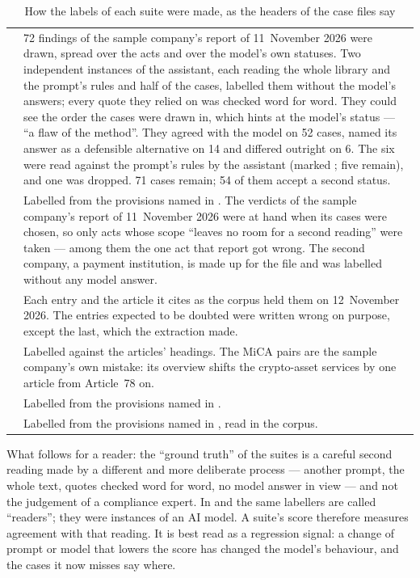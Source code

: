 \begin{table}[H]
\caption{How the labels of each suite were made, as the headers of the case files say}\label{tab:control:labels}
\begin{tabularx}{\textwidth}{@{}L{22mm}Y@{}}
\toprule
{} &  \\
\midrule
{} & 72 findings of the sample company's report of 11~November 2026 were drawn, spread over the acts and over the model's own statuses. Two independent instances of the assistant, each reading the whole library and the prompt's rules and half of the cases, labelled them without the model's answers; every quote they relied on was checked word for word. They could see the order the cases were drawn in, which hints at the model's status --- \enquote{a flaw of the method}. They agreed with the model on 52 cases, named its answer as a defensible alternative on 14 and differed outright on 6. The six were read against the prompt's rules by the assistant (marked ; five remain), and one was dropped. 71 cases remain; 54 of them accept a second status. \\
 & Labelled from the provisions named in . The verdicts of the sample company's report of 11~November 2026 were at hand when its cases were chosen, so only acts whose scope \enquote{leaves no room for a second reading} were taken --- among them the one act that report got wrong. The second company, a payment institution, is made up for the file and was labelled without any model answer. \\
 & Each entry and the article it cites as the corpus held them on 12~November 2026. The entries expected to be doubted were written wrong on purpose, except the last, which the extraction made. \\
 & Labelled against the articles' headings. The MiCA pairs are the sample company's own mistake: its overview shifts the crypto-asset services by one article from Article~78 on. \\
 & Labelled from the provisions named in . \\
 & Labelled from the provisions named in , read in the corpus. \\
\bottomrule
\end{tabularx}
\end{table}

What follows for a reader: the \enquote{ground truth} of the suites is a careful second
reading made by a different and more deliberate process --- another prompt, the whole text,
quotes checked word for word, no model answer in view --- and not the judgement of a
compliance expert. In  and  the same
labellers are called \enquote{readers}; they were instances of an AI model. A suite's score
therefore measures agreement with that reading. It is best read as a regression signal: a
change of prompt or model that lowers the score has changed the model's behaviour, and the
cases it now misses say where.

